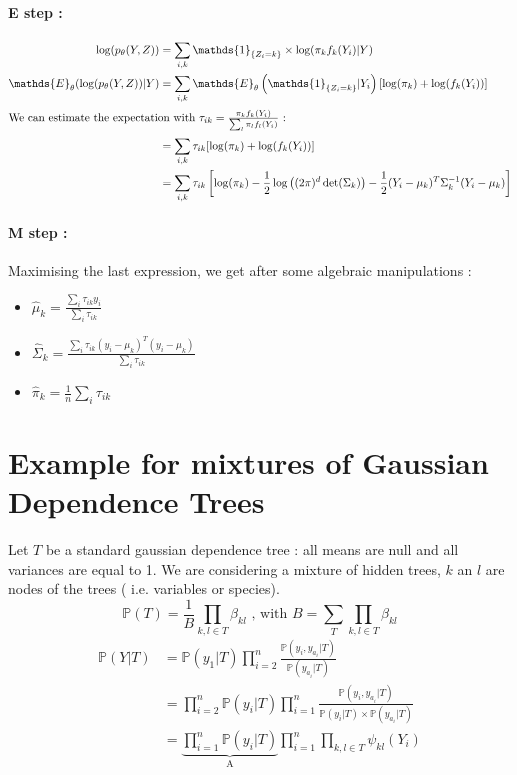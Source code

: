 \documentclass[a4paper,10pt]{article}
\begin{document}
\paragraph{E step :}



\begin{align*}
\log(p_\theta(Y,Z)) &= \sum_{i,k} \mathds{1}_{\{Z_i = k\}} \times \log(\pi_k f_k(Y_i)|Y)\\
\mathds{E}_\theta (\log(p_\theta(Y,Z))|Y)&= \sum_{i,k} \mathds{E}_\theta \left( \mathds{1}_{\{Z_i = k\}} |Y_i\right)[\log(\pi_k) + \log(f_k(Y_i)) ]\\
\intertext{We can estimate the expectation with $\tau_{ik} = \frac{\pi_k f_k(Y_i)}{\sum_{l} \pi_l f_l(Y_i)}$ :}
&= \sum_{i,k}\tau_{ik}[\log(\pi_k) + \log(f_k(Y_i)) ] \\
&= \sum_{i,k}\tau_{ik}\left[\log(\pi_k)-\frac{1}{2}\log\left((2\pi)^d\det(\Sigma_k)\right) - \frac{1}{2}(Y_i - \mu_k)^T\Sigma_k^{-1}(Y_i - \mu_k)\right] \\
\end{align*}


\paragraph{M step :}
Maximising the last expression, we get after some algebraic manipulations :
\begin{itemize}
\item \large{$\hat{\mu}_k = \frac{\sum_i \tau_{ik} y_i}{\sum_i \tau_{ik}}$}\normalsize
\item \large{$\hat{\Sigma}_k = \frac{\sum_i \tau_{ik} (y_i-\mu_k)^T(y_i-\mu_k)}{\sum_i \tau_{ik}}$}\normalsize
\item \large{$\hat{\pi}_k = \frac{1}{n} \sum_i \tau_{ik}$}
\end{itemize}

\section{Example for mixtures of Gaussian Dependence Trees}
Let $T$ be a standard gaussian dependence tree : all means are null and all variances are equal to 1. We are considering a mixture of hidden trees, $k$ an $l$  are nodes of the trees (
i.e. variables or species).\\

\[ \mathds{P}(T) = \frac{1}{B}\prod_{k,l\in T} \beta_{kl} \text{ , with } B = \sum_T \prod_{k,l\in T} \beta_{kl} \]
\begin{align*}
\mathds{P}(Y|T) &=\mathds{P}(y_1|T)\prod_{i=2}^n \frac{\mathds{P}(y_i,y_{a_i}|T)}{\mathds{P}(y_{a_i}|T)}\\
&=\prod_{i=2}^n \mathds{P}(y_i|T)\prod_{i=1}^n \frac{\mathds{P}(y_i,y_{a_i}|T)}{\mathds{P}(y_i|T)\times \mathds{P}(y_{a_i}|T)}\\
&=\underbrace{\prod_{i=1}^n \mathds{P}(y_i|T)}_{\text{A}}\prod_{i=1}^n\prod_{k,l \in T}\psi_{kl}(Y_i)
\end{align*}
\end{document}
